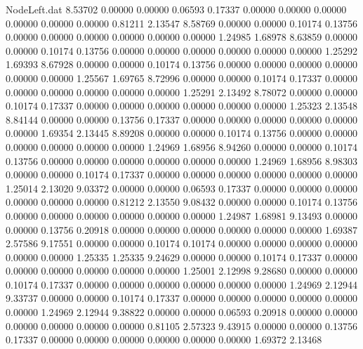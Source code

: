 \begin{filecontents}{NodeLeft.dat}
   8.53702    0.00000    0.00000     0.06593    0.17337    0.00000    0.00000    0.00000    0.00000    0.00000    0.00000    0.81211    2.13547
   8.58769    0.00000    0.00000     0.10174    0.13756    0.00000    0.00000    0.00000    0.00000    0.00000    0.00000    1.24985    1.68978
   8.63859    0.00000    0.00000     0.10174    0.13756    0.00000    0.00000    0.00000    0.00000    0.00000    0.00000    1.25292    1.69393
   8.67928    0.00000    0.00000     0.10174    0.13756    0.00000    0.00000    0.00000    0.00000    0.00000    0.00000    1.25567    1.69765
   8.72996    0.00000    0.00000     0.10174    0.17337    0.00000    0.00000    0.00000    0.00000    0.00000    0.00000    1.25291    2.13492
   8.78072    0.00000    0.00000     0.10174    0.17337    0.00000    0.00000    0.00000    0.00000    0.00000    0.00000    1.25323    2.13548
   8.84144    0.00000    0.00000     0.13756    0.17337    0.00000    0.00000    0.00000    0.00000    0.00000    0.00000    1.69354    2.13445
   8.89208    0.00000    0.00000     0.10174    0.13756    0.00000    0.00000    0.00000    0.00000    0.00000    0.00000    1.24969    1.68956
   8.94260    0.00000    0.00000     0.10174    0.13756    0.00000    0.00000    0.00000    0.00000    0.00000    0.00000    1.24969    1.68956
   8.98303    0.00000    0.00000     0.10174    0.17337    0.00000    0.00000    0.00000    0.00000    0.00000    0.00000    1.25014    2.13020
   9.03372    0.00000    0.00000     0.06593    0.17337    0.00000    0.00000    0.00000    0.00000    0.00000    0.00000    0.81212    2.13550
   9.08432    0.00000    0.00000     0.10174    0.13756    0.00000    0.00000    0.00000    0.00000    0.00000    0.00000    1.24987    1.68981
   9.13493    0.00000    0.00000     0.13756    0.20918    0.00000    0.00000    0.00000    0.00000    0.00000    0.00000    1.69387    2.57586
   9.17551    0.00000    0.00000     0.10174    0.10174    0.00000    0.00000    0.00000    0.00000    0.00000    0.00000    1.25335    1.25335
   9.24629    0.00000    0.00000     0.10174    0.17337    0.00000    0.00000    0.00000    0.00000    0.00000    0.00000    1.25001    2.12998
   9.28680    0.00000    0.00000     0.10174    0.17337    0.00000    0.00000    0.00000    0.00000    0.00000    0.00000    1.24969    2.12944
   9.33737    0.00000    0.00000     0.10174    0.17337    0.00000    0.00000    0.00000    0.00000    0.00000    0.00000    1.24969    2.12944
   9.38822    0.00000    0.00000     0.06593    0.20918    0.00000    0.00000    0.00000    0.00000    0.00000    0.00000    0.81105    2.57323
   9.43915    0.00000    0.00000     0.13756    0.17337    0.00000    0.00000    0.00000    0.00000    0.00000    0.00000    1.69372    2.13468

\end{filecontents}
